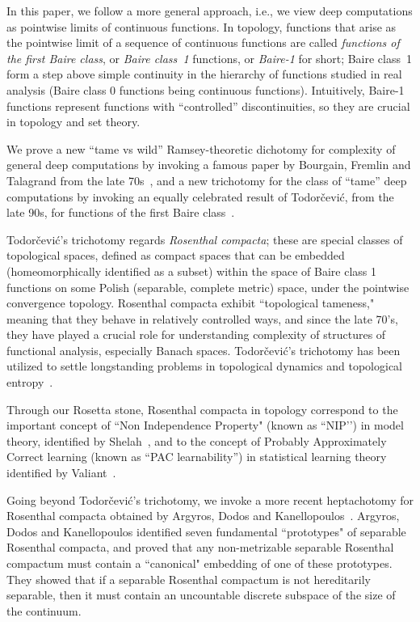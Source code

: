 \documentclass[psamsfonts]{amsart}
\theoremstyle{definition}
\theoremstyle{remark}
\numberwithin{equation}{section}
\begin{document}
 In this paper, we follow a more general approach, i.e., we view deep computations as pointwise limits of continuous functions.
In topology, functions that arise as the pointwise limit of a sequence of continuous functions are called \emph{functions of the first Baire class}, or \emph{Baire class~1} functions, or \emph{Baire-1} for short; Baire class~1 form a step above simple continuity in the hierarchy of functions studied in real analysis  (Baire class 0 functions being continuous functions).
Intuitively, Baire-1 functions represent functions with ``controlled'' discontinuities, so they are  crucial in topology and set theory.

We prove a new ``tame vs wild'' Ramsey-theoretic dichotomy for complexity of general deep computations by invoking a famous paper by Bourgain, Fremlin and Talagrand from the late 70s~\cite{BFT_1978_PCompactBaire}, and  a new trichotomy for the class of ``tame'' deep computations by invoking an equally celebrated result of Todorčević, from the late 90s, for  functions of the first Baire class~\cite{Todorcevic_1999_CompactSubsetsBaire}.

Todorčević’s trichotomy regards \emph{Rosenthal compacta}; these  are special classes of  topological spaces, defined as compact spaces that can be embedded (homeomorphically identified as a subset) within the space of Baire class 1 functions on some Polish (separable, complete metric) space, under the pointwise convergence topology.
Rosenthal compacta  exhibit  ``topological tameness," meaning that they behave in relatively controlled ways, and since the late 70's, they have played a crucial role for understanding complexity of structures of functional analysis, especially Banach spaces.
Todorčević’s trichotomy has been utilized to settle longstanding problems in topological dynamics and topological entropy~\cite{glasner2022tame}.

Through our Rosetta stone, Rosenthal compacta in topology correspond to the important concept of  ``Non Independence Property" (known as ``NIP’’) in model theory, identified by Shelah~\cite{Shelah:1971,Shelah:1990}, and to the concept of  Probably Approximately Correct learning (known as ``PAC learnability'') in statistical learning theory identified by Valiant~\cite{Valiant:1984}.


Going beyond Todorčević’s trichotomy, we invoke a more recent heptachotomy for Rosenthal compacta obtained by Argyros, Dodos and Kanellopoulos~\cite{argyros2008rosenthal}.
Argyros, Dodos and Kanellopoulos identified seven fundamental ``prototypes" of separable Rosenthal compacta, and  proved that any non-metrizable separable Rosenthal compactum must contain a ``canonical" embedding of one of these prototypes.
They showed that if a separable Rosenthal compactum is not hereditarily separable, then it must contain an uncountable discrete subspace of the size of the continuum.
\end{document}
